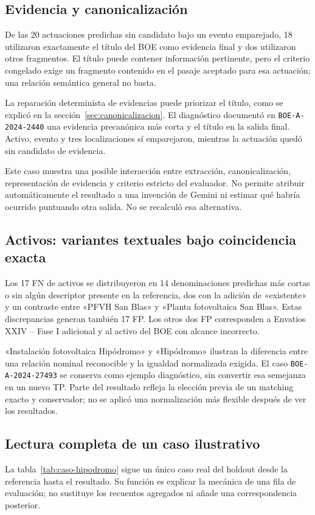 \subsection{Evidencia y canonicalización}
De las 20 actuaciones predichas sin candidato bajo un evento emparejado,
18 utilizaron exactamente el título del BOE como evidencia final y dos
utilizaron otros fragmentos. El título puede contener información pertinente,
pero el criterio congelado exige un fragmento contenido en el pasaje
aceptado para esa actuación; una relación semántica general no basta.

La reparación determinista de evidencias puede priorizar el título, como
se explicó en la sección~\ref{sec:canonicalizacion}. El diagnóstico documentó
en \texttt{BOE-A-2024-2440} una evidencia precanónica más corta y el título
en la salida final. Activo, evento y tres localizaciones sí emparejaron,
mientras la actuación quedó sin candidato de evidencia.

Este caso muestra una posible interacción entre extracción, canonicalización,
representación de evidencia y criterio estricto del evaluador. No permite
atribuir automáticamente el resultado a una invención de Gemini ni estimar
qué habría ocurrido puntuando otra salida. No se recalculó esa alternativa.

\subsection{Activos: variantes textuales bajo coincidencia exacta}
Los 17 FN de activos se distribuyeron en 14 denominaciones predichas más
cortas o sin algún descriptor presente en la referencia, dos con la adición
de «existente» y un contraste entre «PFVH San Blas» y «Planta fotovoltaica
San Blas». Estas discrepancias generan también 17 FP. Los otros dos FP
corresponden a Envatios XXIV -- Fase I adicional y al activo del BOE con
alcance incorrecto.

«Instalación fotovoltaica Hipódromo» y «Hipódromo» ilustran la diferencia
entre una relación nominal reconocible y la igualdad normalizada exigida.
El caso \texttt{BOE-A-2024-27493} se conserva como ejemplo diagnóstico,
sin convertir esa semejanza en un nuevo TP. Parte del resultado refleja
la elección previa de un matching exacto y conservador; no se aplicó una
normalización más flexible después de ver los resultados.

\subsection{Lectura completa de un caso ilustrativo}
La tabla~\ref{tab:caso-hipodromo} sigue un único caso real del holdout desde
la referencia hasta el resultado. Su función es explicar la mecánica de una
fila de evaluación; no sustituye los recuentos agregados ni añade una
correspondencia posterior.


